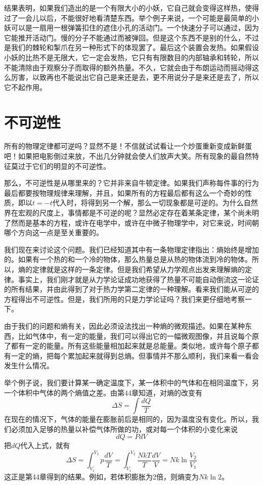 结果表明，如果我们造出的是一个有限大小的小妖，它自己就会变得这样热，使得过了一会儿以后，不能很好地看清楚东西。举个例子来说，一个可能是最简单的小妖可以是一扇用一根弹簧扣住的遮住小孔的活动门。一个快速分子可以通过，因为它能推开活动门。慢的分子不能通过而被弹回。但是这个东西不是别的什么，不过是我们的棘轮和掣爪在另一种形式下的体现罢了。最后这个装置会发热。如果假设小妖的比热不是无限大，它一定会发热，它只有有限数目的内部轴承和转轮，所以不能清除由于观察分子而取得的额外热量。不久，它就会由于布朗运动而摇动得这么厉害，以致再也不能说出它自己是来还是去，更不用说分子是来还是去了，所以它不起作用。

\section{不可逆性}

所有的物理定律都可逆吗？显然不是！不信就试试看让一个炒蛋重新变成新鲜蛋吧！如果把电影倒过来放，不出几分钟就会使人们放声大笑。所有现象的最自然特征莫过于它们的明显的不可逆性。

那么，不可逆性是从哪里来的？它并非来自牛顿定律。如果我们声称每件事的行为最后都要按物理规律来理解，并且，如果所有的方程最后都有这么一个奇妙的性质，即以$t=-t$代入时，将得到另一个解，那么一切现象都是可逆的。为什么自然界在宏观的尺度上，事情都是不可逆的呢？显然必定存在着某条定律，某个尚未明了然而是基本的方程，或许在电学中，或许在中微子物理学中，对它来说，时间朝哪个方向这一点是至关重要的。

我们现在来讨论这个问题。我们已经知道其中有一条物理定律指出：熵始终是增加的。如果有一个热的和一个冷的物体，那么热量总是从热的物体流到冷的物体。所以，熵的定律就是这样的一条定律。但是我们希望从力学观点出发来理解熵的定律。事实上，我们刚才就是从力学论证成功地获得了热量不可能自动倒流这一论证的所有结果，并由此得到了对于热力学第二定律的一种理解。看来我们能从可逆的方程得出不可逆性。但是，我们所用的只是力学论证吗？我们来更仔细地考察一下。

由于我们的问题和熵有关，因此必须设法找出一种熵的微观描述。如果在某种东西，比如气体中，有一定的能量，我们可以得出它的一幅微观图像，并且说每个原了都有一定的能量。所有这些能量相加起来就是总能量。类似地，或许每个原子都有一定的熵，把每个累加起来就得到总熵。但事情并不那么顺利，我们来看一看会发生什么情况。

举个例子说，我们要计算某一确定温度下，某一体积中的气体和在相同温度下，另一个体积中气体的两个熵值之差。由第44章知道，对熵的改变有
\begin{equation*}
    \Delta S = \int \frac{dQ}{T}
\end{equation*}
在现在的情况下，气体的能量在膨胀前后是相同的，因为温度没有变化。所以，我们必须加入足够的热量以补偿气体所做的功，或对每一个体积的小变化来说
\begin{equation*}
    dQ = PdV
\end{equation*}
把$dQ$代入上式，就有
\begin{equation*}
    \Delta S = \int_{V_1}^{V_2}p\frac{dV}{T} = \int_{V_1}^{V_2} \frac{NkT}{T}\frac{dV}{V}=Nk\ln\frac{V_2}{V_1}
\end{equation*}
这正是第44章得到的结果。例如，若体积膨胀为2倍，则熵变为$Nk \ln 2$。

